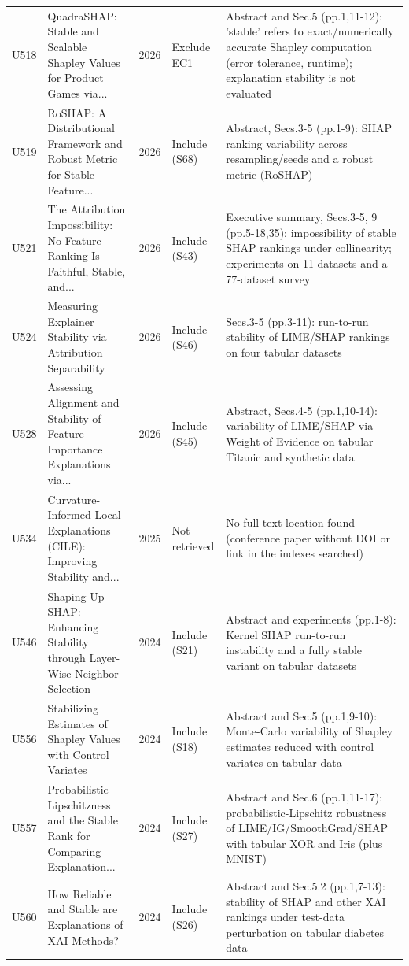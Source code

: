 \begin{longtable}{@{}P{1.0cm}P{6.3cm}P{0.7cm}P{1.6cm}P{6.1cm}@{}}
U518 & QuadraSHAP: Stable and Scalable Shapley Values for Product Games via... & 2026 & Exclude EC1 & Abstract and Sec.5 (pp.1,11-12): 'stable' refers to exact/\allowbreak{}numerically accurate Shapley computation (error tolerance, runtime); explanation stability is not evaluated \\
U519 & RoSHAP: A Distributional Framework and Robust Metric for Stable Feature... & 2026 & Include (S68) & Abstract, Secs.3-5 (pp.1-9): SHAP ranking variability across resampling/\allowbreak{}seeds and a robust metric (RoSHAP) \\
U521 & The Attribution Impossibility: No Feature Ranking Is Faithful, Stable, and... & 2026 & Include (S43) & Executive summary, Secs.3-5, 9 (pp.5-18,35): impossibility of stable SHAP rankings under collinearity; experiments on 11 datasets and a 77-dataset survey \\
U524 & Measuring Explainer Stability via Attribution Separability & 2026 & Include (S46) & Secs.3-5 (pp.3-11): run-to-run stability of LIME/\allowbreak{}SHAP rankings on four tabular datasets \\
U528 & Assessing Alignment and Stability of Feature Importance Explanations via... & 2026 & Include (S45) & Abstract, Secs.4-5 (pp.1,10-14): variability of LIME/\allowbreak{}SHAP via Weight of Evidence on tabular Titanic and synthetic data \\
U534 & Curvature-Informed Local Explanations (CILE): Improving Stability and... & 2025 & Not retrieved & No full-text location found (conference paper without DOI or link in the indexes searched) \\
U546 & Shaping Up SHAP: Enhancing Stability through Layer-Wise Neighbor Selection & 2024 & Include (S21) & Abstract and experiments (pp.1-8): Kernel SHAP run-to-run instability and a fully stable variant on tabular datasets \\
U556 & Stabilizing Estimates of Shapley Values with Control Variates & 2024 & Include (S18) & Abstract and Sec.5 (pp.1,9-10): Monte-Carlo variability of Shapley estimates reduced with control variates on tabular data \\
U557 & Probabilistic Lipschitzness and the Stable Rank for Comparing Explanation... & 2024 & Include (S27) & Abstract and Sec.6 (pp.1,11-17): probabilistic-Lipschitz robustness of LIME/\allowbreak{}IG/\allowbreak{}SmoothGrad/\allowbreak{}SHAP with tabular XOR and Iris (plus MNIST) \\
U560 & How Reliable and Stable are Explanations of XAI Methods? & 2024 & Include (S26) & Abstract and Sec.5.2 (pp.1,7-13): stability of SHAP and other XAI rankings under test-data perturbation on tabular diabetes data \\

\end{longtable}
